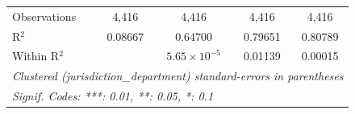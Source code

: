 \begin{tabular}{lcccc}
   Observations              & 4,416          & 4,416                 & 4,416          & 4,416\\  
   R$^2$                     & 0.08667        & 0.64700               & 0.79651        & 0.80789\\  
   Within R$^2$              &                & $5.65\times 10^{-5}$  & 0.01139        & 0.00015\\  
   \midrule \midrule
   \multicolumn{5}{l}{\emph{Clustered (jurisdiction\_department) standard-errors in parentheses}}\\
   \multicolumn{5}{l}{\emph{Signif. Codes: ***: 0.01, **: 0.05, *: 0.1}}\\
\end{tabular}
\par\endgroup
